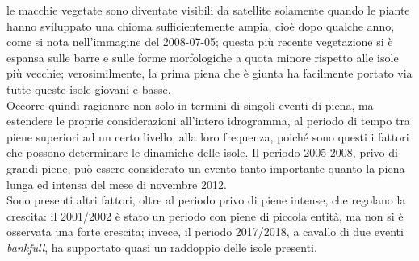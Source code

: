 le macchie vegetate sono diventate visibili da satellite solamente quando le piante hanno sviluppato una chioma sufficientemente ampia, cioè dopo qualche anno, come si nota nell'immagine del 2008-07-05;
questa più recente vegetazione si è espansa sulle barre e sulle forme morfologiche a quota minore rispetto alle isole più vecchie;
verosimilmente, la prima piena che è giunta ha facilmente portato via tutte queste isole giovani e basse.
\\
Occorre quindi ragionare non solo in termini di singoli eventi di piena, ma estendere le proprie considerazioni all'intero idrogramma, al periodo di tempo tra piene superiori ad un certo livello, alla loro frequenza, poiché sono questi i fattori che possono determinare le dinamiche delle isole.
Il periodo 2005-2008, privo di grandi piene, può essere considerato un evento tanto importante quanto la piena lunga ed intensa del mese di novembre 2012.
\\
Sono presenti altri fattori, oltre al periodo privo di piene intense, che regolano la crescita: il 2001/2002 è stato un periodo con piene di piccola entità, ma non si è osservata una forte crescita; invece, il periodo 2017/2018, a cavallo di due eventi \emph{bankfull}, ha supportato quasi un raddoppio delle isole presenti.

